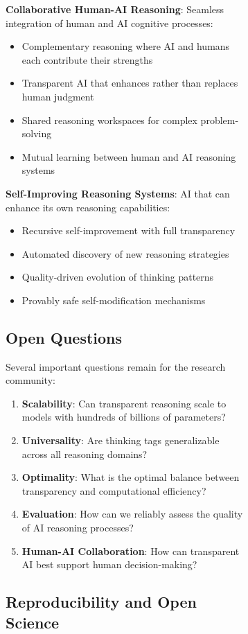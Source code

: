 \begin{figure}[H]
\begin{table}[H]
\begin{figure}[H]
\begin{table}[H]
\begin{table}[H]
\textbf{Collaborative Human-AI Reasoning}: Seamless integration of human and AI cognitive processes:
\begin{itemize}
    \item Complementary reasoning where AI and humans each contribute their strengths
    \item Transparent AI that enhances rather than replaces human judgment
    \item Shared reasoning workspaces for complex problem-solving
    \item Mutual learning between human and AI reasoning systems
\end{itemize}

\textbf{Self-Improving Reasoning Systems}: AI that can enhance its own reasoning capabilities:
\begin{itemize}
    \item Recursive self-improvement with full transparency
    \item Automated discovery of new reasoning strategies
    \item Quality-driven evolution of thinking patterns
    \item Provably safe self-modification mechanisms
\end{itemize}

\subsection{Open Questions}

Several important questions remain for the research community:

\begin{enumerate}
    \item \textbf{Scalability}: Can transparent reasoning scale to models with hundreds of billions of parameters?
    \item \textbf{Universality}: Are thinking tags generalizable across all reasoning domains?
    \item \textbf{Optimality}: What is the optimal balance between transparency and computational efficiency?
    \item \textbf{Evaluation}: How can we reliably assess the quality of AI reasoning processes?
    \item \textbf{Human-AI Collaboration}: How can transparent AI best support human decision-making?
\end{enumerate}

\subsection{Reproducibility and Open Science}


\end{table}
\end{table}
\end{figure}
\end{table}
\end{figure}
